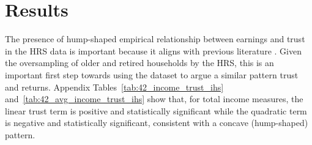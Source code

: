 \onlyinsubfile{\setcounter{section}{3}}
\section{Results}
\label{sec:chapter2-results}

\providecommand{\ChapterTableNoteText}[1]{\parbox[t]{0.94\textwidth}{#1}}
\providecommand{\InputStataRegTable}[4]{%
\begin{table}[htbp]
\centering
\caption{#1}%
\label{#2}%
\begin{threeparttable}
\small
\resizebox{\textwidth}{!}{%
%
}%
\begin{tablenotes}[flushleft]
\footnotesize
\item \ChapterTableNoteText{#4}%
\end{tablenotes}
\end{threeparttable}
\end{table}%
}
\providecommand{\InputStataRegTableCompact}[4]{%
\begin{table}[htbp]
\centering
\caption{#1}%
\label{#2}%
\begin{threeparttable}
\begingroup
\footnotesize
\setlength{\tabcolsep}{4pt}%
\renewcommand{\arraystretch}{0.94}%
\resizebox{\textwidth}{!}{%
%
}%
\endgroup
\begin{tablenotes}[flushleft]
\footnotesize
\item \ChapterTableNoteText{#4}%
\end{tablenotes}
\end{threeparttable}
\end{table}%
}


\par The presence of hump-shaped empirical relationship between earnings and trust in the HRS data is important because it aligns with previous literature \cite{jbpglg2016}. Given the oversampling of older and retired households by the HRS, this is an important first step towards using the dataset to argue a similar pattern trust and returns. Appendix Tables~\ref{tab:42_income_trust_ihs} and~\ref{tab:42_avg_income_trust_ihs} show that, for total income measures, the linear trust term is positive and statistically significant while the quadratic term is negative and statistically significant, consistent with a concave (hump-shaped) pattern.


